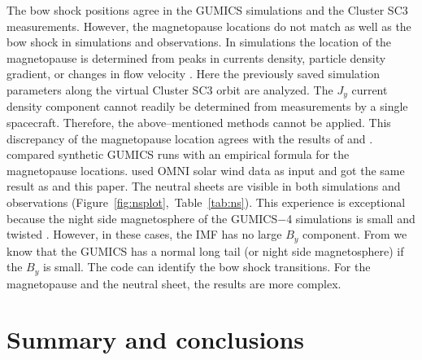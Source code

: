 \documentclass[linenumbers,draft]{agujournal}
\begin{document}
The bow shock positions agree in the GUMICS simulations and the Cluster SC3 measurements. However, the magnetopause locations do not match as well as the bow shock in simulations and observations. In simulations the location of the magnetopause is determined from peaks in currents density, particle density gradient, or changes in flow velocity \citep[][see references therein]{siscoe01:_magnet_fluop,garcia07:_findin_lyon_fedder_mobar,gordeev13:_verif_gumic_mhd}. Here the previously saved simulation parameters along the virtual Cluster SC3 orbit are analyzed. The $J_{y}$ current density component cannot readily be determined from measurements by a single spacecraft. Therefore, the above--mentioned methods cannot be applied. This discrepancy of the magnetopause location agrees with the results of \citet{gordeev13:_verif_gumic_mhd} and \citet{facsko16:_one_earth}. \citet{gordeev13:_verif_gumic_mhd} compared synthetic GUMICS runs with an empirical formula for the magnetopause locations. \citet{facsko16:_one_earth} used OMNI solar wind data as input and got the same result as \citet{gordeev13:_verif_gumic_mhd} and this paper. The neutral sheets are visible in both simulations and observations (Figure~\ref{fig:nsplot},~Table~\ref{tab:ns}). This experience is exceptional because the night side magnetosphere of the GUMICS$-$4 simulations is small and twisted \citep{gordeev13:_verif_gumic_mhd,facsko16:_one_earth}. However, in these cases, the IMF has no large $B_{y}$ component. From \citet{facsko16:_one_earth} we know that the GUMICS has a normal long tail (or night side magnetosphere) if the $B_{y}$ is small. The code can identify the bow shock transitions. For the magnetopause and the neutral sheet, the results are more complex.

\section{Summary and conclusions}
\label{sec:concl}
\end{document}
